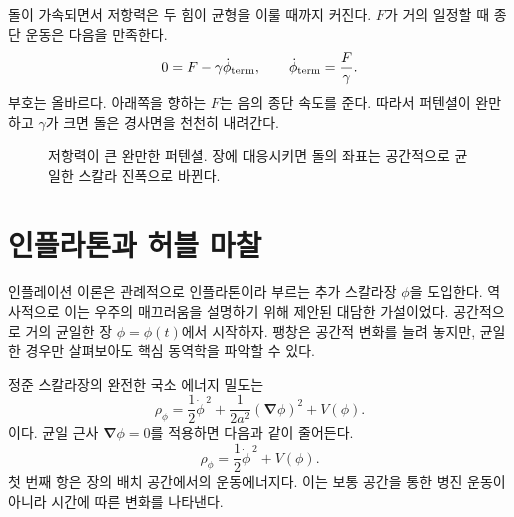 \begin{classroomqa}
\end{classroomqa}

돌이 가속되면서 저항력은 두 힘이 균형을 이룰 때까지 커진다. \(F\)가 거의 일정할 때 종단 운동은 다음을 만족한다.
\begin{equation}
0=F-\gamma\dot\phi_{\rm term},
\qquad
\dot\phi_{\rm term}=\frac{F}{\gamma}.
\end{equation}
부호는 올바르다. 아래쪽을 향하는 \(F\)는 음의 종단 속도를 준다. 따라서 퍼텐셜이 완만하고 \(\gamma\)가 크면 돌은 경사면을 천천히 내려간다.

\begin{figure}[htbp]
\centering
{}
\caption{저항력이 큰 완만한 퍼텐셜. 장에 대응시키면 돌의 좌표는 공간적으로 균일한 스칼라 진폭으로 바뀐다.}
\label{fig:c08-shallow-potential}
\end{figure}

\section{인플라톤과 허블 마찰}

인플레이션 이론은 관례적으로 인플라톤이라 부르는 추가 스칼라장 \(\phi\)을 도입한다. 역사적으로 이는 우주의 매끄러움을 설명하기 위해 제안된 대담한 가설이었다. 공간적으로 거의 균일한 장 \(\phi=\phi(t)\)에서 시작하자. 팽창은 공간적 변화를 늘려 놓지만, 균일한 경우만 살펴보아도 핵심 동역학을 파악할 수 있다.

정준 스칼라장의 완전한 국소 에너지 밀도는
\begin{equation}
\rho_\phi
=
\frac12\dot\phi^{\,2}
+\frac{1}{2a^2}(\boldsymbol\nabla\phi)^2
+V(\phi).
\end{equation}
이다. 균일 근사 \(\boldsymbol\nabla\phi=0\)를 적용하면 다음과 같이 줄어든다.
\begin{equation}
\rho_\phi=\frac12\dot\phi^{\,2}+V(\phi).
\label{eq:c08-scalar-density}
\end{equation}
첫 번째 항은 장의 배치 공간에서의 운동에너지다. 이는 보통 공간을 통한 병진 운동이 아니라 시간에 따른 변화를 나타낸다.

